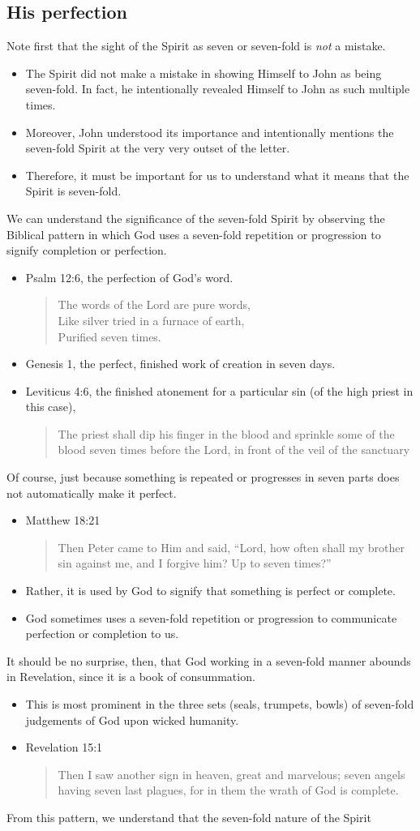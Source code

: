 \documentclass[12pt]{article}
\newcommand{\BI}{\begin{itemize}}
\newcommand{\EI}{\end{itemize}}
\newcommand{\I}{\item}
\newcommand{\Q}[1]{\begin{quote} #1 \end{quote}}
\begin{document}
\subsection{His perfection}
\I  Note first that the sight of the Spirit as seven or seven-fold is
    \emph{not} a mistake.
\BI \I  The Spirit did not make a mistake in showing Himself to John
        as being seven-fold.
        In fact, he intentionally revealed Himself to John as such multiple times.
    \I  Moreover, John understood its importance and intentionally mentions
        the seven-fold Spirit at the very very outset of the letter.
    \I  Therefore, it must be important for us to understand what
        it means that the Spirit is seven-fold. \EI
\I  We can understand the significance of the seven-fold Spirit
    by observing the Biblical pattern 
    in which God uses a seven-fold repetition or progression to 
    signify completion or perfection.
\BI \I  Psalm 12:6, the perfection of God's word.
        \Q{ The words of the Lord are pure words, \\
            Like silver tried in a furnace of earth, \\
            Purified seven times.}
    \I  Genesis 1, the perfect, finished work of creation in seven days.
    \I  Leviticus 4:6, the finished atonement for a particular sin
        (of the high priest in this case),
        \Q{ The priest shall dip his finger in the blood and sprinkle some 
            of the blood seven times before the Lord, in front of the veil 
            of the sanctuary} \EI
\I  Of course, just because something is repeated or progresses in seven parts
    does not automatically make it perfect.
\BI \I  Matthew 18:21
        \Q{ Then Peter came to Him and said,
            ``Lord, how often shall my brother sin against me,
            and I forgive him? 
            Up to seven times?''} 
    \I  Rather, it is used by God to signify that something is perfect or complete. 
    \I  God sometimes uses a seven-fold repetition or progression
        to communicate perfection or completion to us. \EI
\I  It should be no surprise, then, that God working in a seven-fold manner
    abounds in Revelation, since it is a book of consummation.
\BI \I  This is most prominent in the three sets (seals, trumpets, bowls)
        of seven-fold judgements of God upon wicked humanity.
    \I  Revelation 15:1
        \Q{ Then I saw another sign in heaven, great and marvelous;
            seven angels having seven last plagues,
            for in them the wrath of God is complete.} \EI
\I  From this pattern, we understand that the seven-fold nature of the Spirit 
\end{document}
